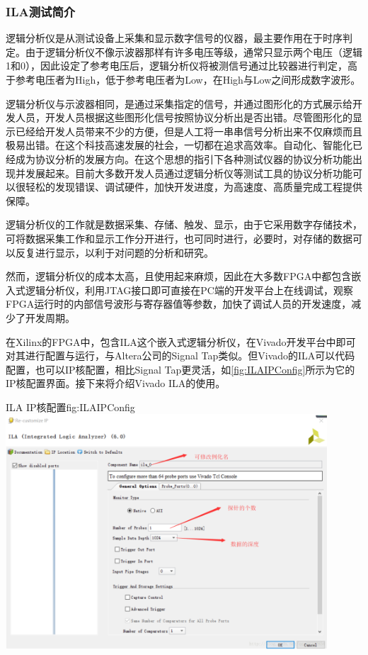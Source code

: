 \documentclass[supercite]{HustGraduPaper}
\begin{document}
	\subsubsection{ILA测试简介}
	
	
	逻辑分析仪是从测试设备上采集和显示数字信号的仪器，最主要作用在于时序判定。由于逻辑分析仪不像示波器那样有许多电压等级，通常只显示两个电压（逻辑1和0），因此设定了参考电压后，逻辑分析仪将被测信号通过比较器进行判定，高于参考电压者为High，低于参考电压者为Low，在High与Low之间形成数字波形。
	
	逻辑分析仪与示波器相同，是通过采集指定的信号，并通过图形化的方式展示给开发人员，开发人员根据这些图形化信号按照协议分析出是否出错。尽管图形化的显示已经给开发人员带来不少的方便，但是人工将一串串信号分析出来不仅麻烦而且极易出错。在这个科技高速发展的社会，一切都在追求高效率。自动化、智能化已经成为协议分析的发展方向。在这个思想的指引下各种测试仪器的协议分析功能出现并发展起来。目前大多数开发人员通过逻辑分析仪等测试工具的协议分析功能可以很轻松的发现错误、调试硬件，加快开发进度，为高速度、高质量完成工程提供保障。
	
	逻辑分析仪的工作就是数据采集、存储、触发、显示，由于它采用数字存储技术，可将数据采集工作和显示工作分开进行，也可同时进行，必要时，对存储的数据可以反复进行显示，以利于对问题的分析和研究。
	
	然而，逻辑分析仪的成本太高，且使用起来麻烦，因此在大多数FPGA中都包含嵌入式逻辑分析仪，利用JTAG接口即可直接在PC端的开发平台上在线调试，观察FPGA运行时的内部信号波形与寄存器值等参数，加快了调试人员的开发速度，减少了开发周期。
	
	在Xilinx的FPGA中，包含ILA这个嵌入式逻辑分析仪，在Vivado开发平台中即可对其进行配置与运行，与Altera公司的Signal Tap类似。但Vivado的ILA可以代码配置，也可以IP核配置，相比Signal Tap更灵活，如\autoref{fig:ILAIPConfig}所示为它的IP核配置界面。接下来将介绍Vivado ILA的使用。
	
	\begin{generalfig}[htb]{ILA IP核配置}{fig:ILAIPConfig}
		\includegraphics[width=12cm]{Figures/ILAIPConfig.png}
	\end{generalfig}
\end{document}
